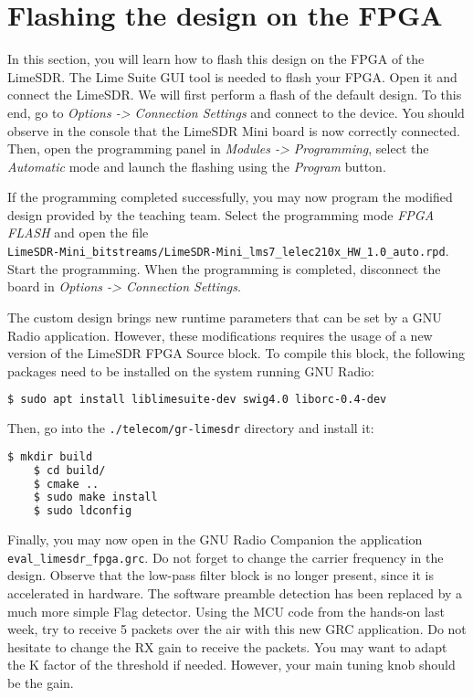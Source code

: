 


\section{Flashing the design on the FPGA}

 In this section, you will learn how to flash this design on the FPGA of the LimeSDR. The Lime Suite GUI tool is needed to flash your FPGA. Open it and connect the LimeSDR. We will first perform a flash of the default design. To this end, go to \textit{Options -> Connection Settings} and connect to the device. You should observe in the console that the LimeSDR Mini board is now correctly connected. Then, open the programming panel in \textit{Modules -> Programming}, select the \textit{Automatic} mode and launch the flashing using the \textit{Program} button.

If the programming completed successfully, you may now program the modified design provided by the teaching team. Select the programming mode \textit{FPGA FLASH} and open the file \\ \texttt{LimeSDR-Mini\_bitstreams/LimeSDR-Mini\_lms7\_lelec210x\_HW\_1.0\_auto.rpd}. Start the programming. When the programming is completed, disconnect the board in \textit{Options -> Connection Settings}.

The custom design brings new runtime parameters that can be set by a GNU Radio application. However, these modifications requires the usage of a new version of the LimeSDR FPGA Source block. To compile this block, the following packages need to be installed on the system running GNU Radio:
\begin{lstlisting}[language=bash]
    $ sudo apt install liblimesuite-dev swig4.0 liborc-0.4-dev
\end{lstlisting}
Then, go into the \texttt{./telecom/gr-limesdr} directory and install it:
\begin{lstlisting}[language=bash]
    $ mkdir build
    $ cd build/
    $ cmake ..
    $ sudo make install
    $ sudo ldconfig
\end{lstlisting}

Finally, you may now open in the GNU Radio Companion the application \texttt{eval\_limesdr\_fpga.grc}. Do not forget to change the carrier frequency in the design. Observe that the low-pass filter block is no longer present, since it is accelerated in hardware. The software preamble detection has been replaced by a much more simple Flag detector. Using the MCU code from the hands-on last week, try to receive 5 packets over the air with this new GRC application. Do not hesitate to change the RX gain to receive the packets. You may want to adapt the K factor of the threshold if needed. However, your main tuning knob should be the gain.



